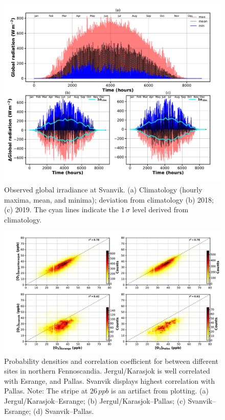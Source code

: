 \documentclass[bg, manuscript]{copernicus}
\begin{document}
\appendixfigures  %
\begin{figure}[t]
  \includegraphics[width=12cm]{figA1}
  \caption{Observed global irradiance at Svanvik. (a) Climatology (hourly maxima, mean, and minima); deviation from climatology (b) 2018; (c) 2019. The cyan lines indicate the $1\,\sigma$ level derived from climatology.}
  \label{fig:global_rad_clim}
\end{figure}

\begin{figure}[t]
  \includegraphics[width=12cm]{figA2}
  \caption{Probability densities and correlation coefficient for \chem{[O_3]} between different sites in northern Fennoscandia. Jergul/Karasjok is well correlated with Esrange, and Pallas. Svanvik displays highest correlation with Pallas. Note: The stripe at $26\,\unit{ppb}$ is an artifact from plotting. (a) Jergul/Karasjok--Esrange; (b) Jergul/Karasjok--Pallas; (c) Svanvik--Esrange; (d) Svanvik--Pallas.}
  \label{fig:density_distribution}
\end{figure}
\end{document}
